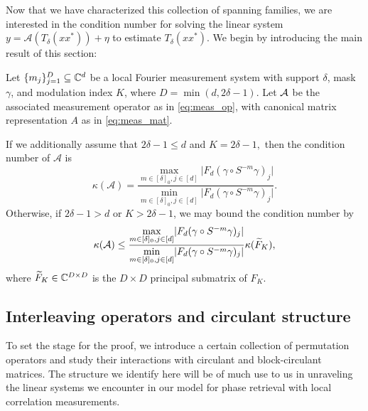 Now that we have characterized this collection of spanning families, we are interested in the condition number for solving the linear system $y = \mathcal{A}(T_{\delta}(xx^*)) + \eta$ to estimate $T_\delta(xx^*)$.  We begin by introducing the main result of this section:

\begin{proposition}
  Let $\{m_j\}_{j = 1}^D \subseteq \mathbb{C}^d$ be a local Fourier measurement system with support $\delta$, mask $\gamma$, and modulation index $K$, where $D = \min(d, 2 \delta - 1)$.  Let $\mathcal{A}$ be the associated measurement operator as in \eqref{eq:meas_op}, with canonical matrix representation $A$ as in \eqref{eq:meas_mat}.

If we additionally assume that $2 \delta - 1 \le d$ and $K = 2 \delta - 1,$ then the condition number of $\mathcal{A}$ is \begin{equation}\kappa(\mathcal{A}) = \dfrac{\max\limits_{m \in [\delta]_0, j \in [d]} \lvert F_d (\gamma \circ S^{-m} \gamma)_j \rvert}{\min\limits_{m \in [\delta]_0, j \in [d]} \lvert F_d (\gamma \circ S^{-m} \gamma)_j \rvert}.\label{eq:clean_cond}\end{equation}  Otherwise, if $2 \delta - 1 > d$ or $K > 2 \delta - 1$, we may bound the condition number by \begin{equation}\kappa(\mathcal{A}) \le \dfrac{\max\limits_{m \in [\delta]_0, j \in [d]} \lvert F_d (\gamma \circ S^{-m} \gamma)_j \rvert}{\min\limits_{m \in [\delta]_0, j \in [d]} \lvert F_d (\gamma \circ S^{-m} \gamma)_j \rvert} \kappa(\widetilde{F}_K), \label{eq:messy_cond}\end{equation} where $\widetilde{F}_K \in \mathbb{C}^{D \times D}$ is the $D \times D$ principal submatrix of $F_K$.
\label{prop:span_fam_cond}
\end{proposition}

\subsection{Interleaving operators and circulant structure}
\label{sec:interlemma}

To set the stage for the proof, we introduce a certain collection of permutation operators and study their interactions with circulant and block-circulant matrices.  The structure we identify here will be of much use to us in unraveling the linear systems we encounter in our model for phase retrieval with local correlation measurements.

